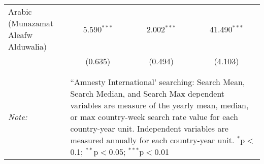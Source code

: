 \begin{table}[!htbp]
\begin{tabular}{@{\extracolsep{5pt}}lccc}
  Arabic (Munazamat Aleafw Alduwalia) & 5.590$^{***}$ & 2.002$^{***}$ & 41.490$^{***}$ \\ 
  & (0.635) & (0.494) & (4.103) \\ 
 \hline \\[-1.8ex] 
\hline 
\hline \\[-1.8ex] 
\textit{Note:}  & \multicolumn{3}{l}{\parbox[t]{8cm}{``Amnesty International' searching: Search Mean, Search Median, and Search Max dependent variables are measure of the yearly mean, median, or max country-week search rate value for each country-year unit. Independent variables are measured annually for each country-year unit. $^{*}$p$<$0.1; $^{**}$p$<$0.05; $^{***}$p$<$0.01}} \\ 
\end{tabular} 
\end{table} 
